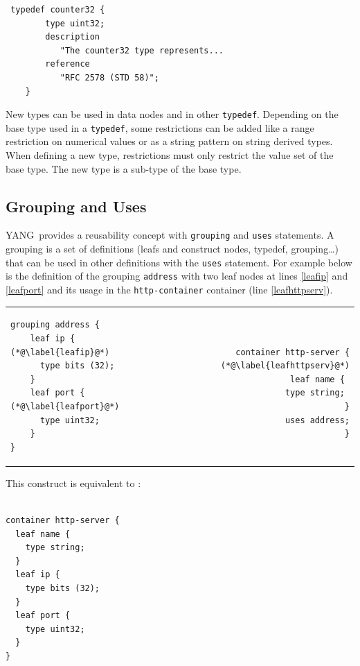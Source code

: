 \documentclass[a4paper]{article}
\newcommand{\y}{YANG}
\begin{document}
\begin{lstlisting}
 typedef counter32 {
        type uint32;
        description
           "The counter32 type represents...
        reference
           "RFC 2578 (STD 58)";
    }
\end{lstlisting}

New  types can  be used  in  data nodes  and in  other {\tt  typedef}.
Depending on the base type  used in a {\tt typedef}, some restrictions
can be  added like  a range  restriction on numerical  values or  as a
string  pattern on  string derived  types. When  defining a  new type,
restrictions must  only restrict the value  set of the  base type. The
new type is a sub-type of the base type.

\subsection{Grouping and Uses}

\y\ provides a reusability concept  with {\tt grouping} and {\tt uses}
statements. A  grouping is a  set of definitions (leafs  and construct
nodes, typedef, grouping\ldots) that  can be used in other definitions
with the {\tt uses} statement.  For example below is the definition of
the grouping {\tt  address} with two leaf nodes  at lines \ref{leafip}
and  \ref{leafport}   and  its  usage  in   the  {\tt  http-container}
container (line \ref{leafhttpserv}).

\noindent
\begin{tabular}{lr}
\begin{minipage}{.5\textwidth}
\begin{lstlisting}[name=grouping]
grouping address {
    leaf ip { (*@\label{leafip}@*)
      type bits (32);
    }
    leaf port {  (*@\label{leafport}@*)
      type uint32;
    }
}
\end{lstlisting}
\end{minipage}
&
\begin{minipage}{.5\textwidth}
\begin{lstlisting}[name=grouping]

container http-server { (*@\label{leafhttpserv}@*)
  leaf name { 
    type string; 
  }
  uses address;
}
\end{lstlisting}
\end{minipage}
\end{tabular}

This construct is equivalent to :

\noindent
\begin{lstlisting}

container http-server {
  leaf name { 
    type string; 
  }
  leaf ip {
    type bits (32);
  }
  leaf port {
    type uint32;
  }
}
\end{lstlisting}
\end{document}

